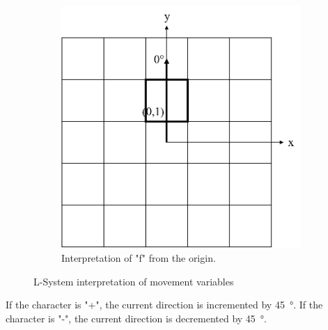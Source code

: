 \begin{figure}[H]
\begin{subfigure}[c]{0.4\textwidth}
		\includegraphics[width=\textwidth]{LSfsmall.png}
		\caption{Interpretation of "f" from the origin.}
	\end{subfigure}
	\caption[L-System movement interpretation]{L-System interpretation of movement variables}
	\label{fig:lsmove}
\end{figure}

If the character is "+", the current direction is incremented by \SI{45}{\degree}. If the character is "-", the current direction is decremented by \SI{45}{\degree}.

